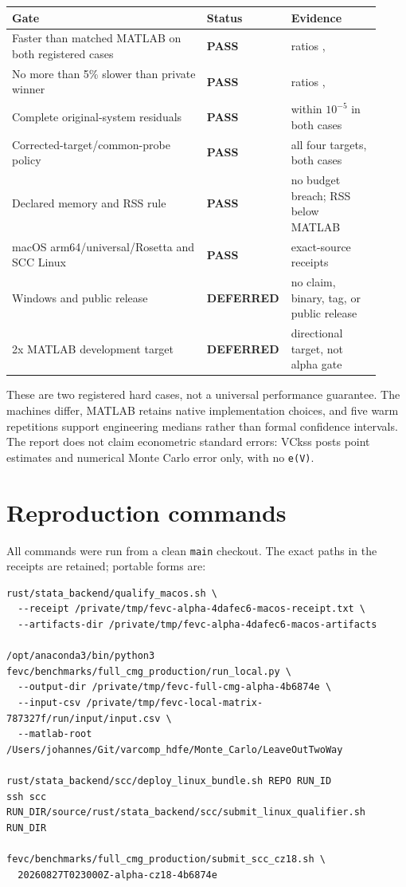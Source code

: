 \documentclass[10pt]{article}
\newcommand{\code}[1]{\texttt{#1}}
\newcommand{\pass}{\textcolor{vgreen}{\textbf{PASS}}}
\newcommand{\deferred}{\textcolor{vgold}{\textbf{DEFERRED}}}
\begin{document}
\begin{tabular}{>{\raggedright\arraybackslash}p{0.52\linewidth}p{0.16\linewidth}p{0.24\linewidth}}
\toprule
Gate & Status & Evidence \\
\midrule
Faster than matched MATLAB on both registered cases & \pass & ratios \MacRatio{}, \SccRatio{} \\
No more than 5\% slower than private winner & \pass & ratios \MacPrivateRatio{}, \SccPrivateRatio{} \\
Complete original-system residuals & \pass & within $10^{-5}$ in both cases \\
Corrected-target/common-probe policy & \pass & all four targets, both cases \\
Declared memory and RSS rule & \pass & no budget breach; RSS below MATLAB \\
macOS arm64/universal/Rosetta and SCC Linux & \pass & exact-source receipts \\
Windows and public release & \deferred & no claim, binary, tag, or public release \\
2x MATLAB development target & \deferred & directional target, not alpha gate \\
\bottomrule
\end{tabular}
\par\medskip

These are two registered hard cases, not a universal performance guarantee.
The machines differ, MATLAB retains native implementation choices, and five
warm repetitions support engineering medians rather than formal confidence
intervals. The report does not claim econometric standard errors: VCkss posts
point estimates and numerical Monte Carlo error only, with no \code{e(V)}.

\section{Reproduction commands}

All commands were run from a clean \code{main} checkout. The exact paths in
the receipts are retained; portable forms are:

\begin{verbatim}
rust/stata_backend/qualify_macos.sh \
  --receipt /private/tmp/fevc-alpha-4dafec6-macos-receipt.txt \
  --artifacts-dir /private/tmp/fevc-alpha-4dafec6-macos-artifacts

/opt/anaconda3/bin/python3 fevc/benchmarks/full_cmg_production/run_local.py \
  --output-dir /private/tmp/fevc-full-cmg-alpha-4b6874e \
  --input-csv /private/tmp/fevc-local-matrix-787327f/run/input/input.csv \
  --matlab-root /Users/johannes/Git/varcomp_hdfe/Monte_Carlo/LeaveOutTwoWay

rust/stata_backend/scc/deploy_linux_bundle.sh REPO RUN_ID
ssh scc RUN_DIR/source/rust/stata_backend/scc/submit_linux_qualifier.sh RUN_DIR

fevc/benchmarks/full_cmg_production/submit_scc_cz18.sh \
  20260827T023000Z-alpha-cz18-4b6874e
\end{verbatim}
\end{document}
